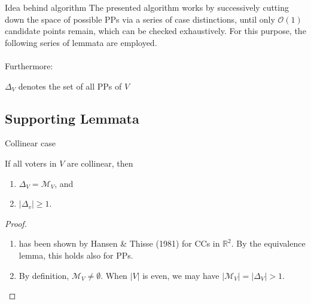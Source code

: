 \documentclass{beamer}
\newcommand{\RR}{\mathbb{R}}
\newcommand{\order}[1]{\ensuremath{\mathcal{O}(#1)}}
\begin{document}
\begin{frame}{Idea behind algorithm}
  The presented algorithm works by successively cutting down the space of possible PPs via a series
  of case distinctions, until only \order{1} candidate points remain, which can be checked
  exhaustively. For this purpose, the following series of lemmata are employed. \\~\\

  Furthermore:
  \begin{definition}[]
    \(\Delta_V\) denotes the set of all PPs of \(V\)
  \end{definition}
\end{frame}


\subsection{Supporting Lemmata}

\begin{frame}{Collinear case} 
  \begin{lemma} %
    If all voters in \(V\) are collinear, then
    \begin{enumerate}
    \item \(\Delta_V = \mathcal{M}_V\), and
    \item \(\lvert\Delta_{v}\rvert \geq 1\).
    \end{enumerate}
  \end{lemma}
  \begin{proof}
    \begin{enumerate}
    \item has been shown by Hansen \& Thisse (1981) for CCs in \(\RR^2\). By the
      equivalence lemma, this holds also for PPs.
    \item By definition, \(\mathcal{M}_V \neq \emptyset\). When \(\lvert V\rvert\) is even, we may
      have \(\lvert\mathcal{M}_V\rvert = \lvert\Delta_V\rvert > 1\).
    \end{enumerate}
\end{proof}
\end{frame}
\end{document}
